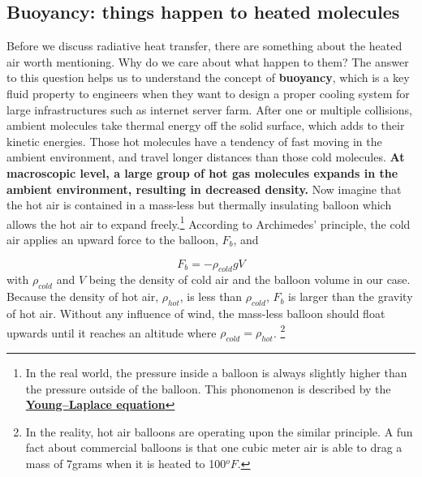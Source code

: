 \subsection{Buoyancy: things happen to heated molecules}

\quad Before we discuss radiative heat transfer, there are something about the heated air worth mentioning. Why do we care about what happen to them? The answer to this question helps us to understand the concept of \textbf{buoyancy}, which is a key fluid property to engineers when they want to design a proper cooling system for large infrastructures such as internet server farm. After one or multiple collisions, ambient molecules take thermal energy off the solid surface, which adds to their kinetic energies. Those hot molecules have a tendency of fast moving in the ambient environment, and travel longer distances than those cold molecules. \textbf{At macroscopic level, a large group of hot gas molecules expands in the ambient environment, resulting in decreased density.} Now imagine that the hot air is contained in a mass-less but thermally insulating balloon which allows the hot air to expand freely.\footnote{In the real world, the pressure inside a balloon is always slightly higher than the pressure outside of the balloon. This phonomenon is described by the \href{https://en.wikipedia.org/wiki/Young\%E2\%80\%93Laplace_equation}{\textbf{Young–Laplace equation}}} According to Archimedes' principle, the cold air applies an upward force to the balloon, $F_b$, and

\begin{equation}
    F_b=-\rho_{cold} g V
    \label{eqn7}
\end{equation}
with $\rho_{cold}$ and $V$ being the density of cold air and the balloon volume in our case. Because the density of hot air, $\rho_{hot}$, is less than $\rho_{cold}$, $F_b$ is larger than the gravity of hot air. Without any influence of wind, the mass-less balloon should float upwards until it reaches an altitude where $\rho_{cold}=\rho_{hot}$. \footnote{In the reality, hot air balloons are operating upon the similar principle. A fun fact about commercial balloons is that one cubic meter air is able to drag a mass of 7grams when it is heated to 100${}^oF$.}

